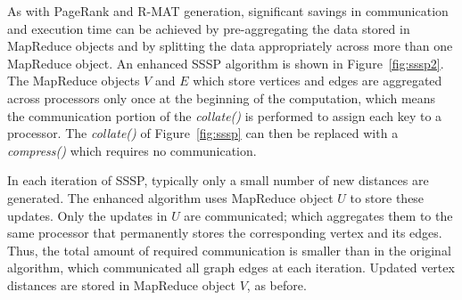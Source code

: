 As with PageRank and R-MAT generation, significant savings in
communication and execution time can be achieved by pre-aggregating
the data stored in MapReduce objects and by splitting the data
appropriately across more than one MapReduce object.  An enhanced SSSP
algorithm is shown in Figure~\ref{fig:sssp2}.  The MapReduce objects
$V$ and $E$ which store vertices and edges are aggregated across
processors only once at the beginning of the computation, which means
the communication portion of the {\it collate()} is performed to
assign each key to a processor.  The {\it collate()} of
Figure~\ref{fig:sssp} can then be replaced with a {\it compress()}
which requires no communication.

In each iteration of SSSP, typically only a small number of new
distances are generated.  The enhanced algorithm uses MapReduce object
$U$ to store these updates.  Only the updates in $U$ are communicated;
which aggregates them to the same processor that permanently stores
the corresponding vertex and its edges.  Thus, the total amount of
required communication is smaller than in the original algorithm,
which communicated all graph edges at each iteration.  Updated vertex
distances are stored in MapReduce object $V$, as before.


